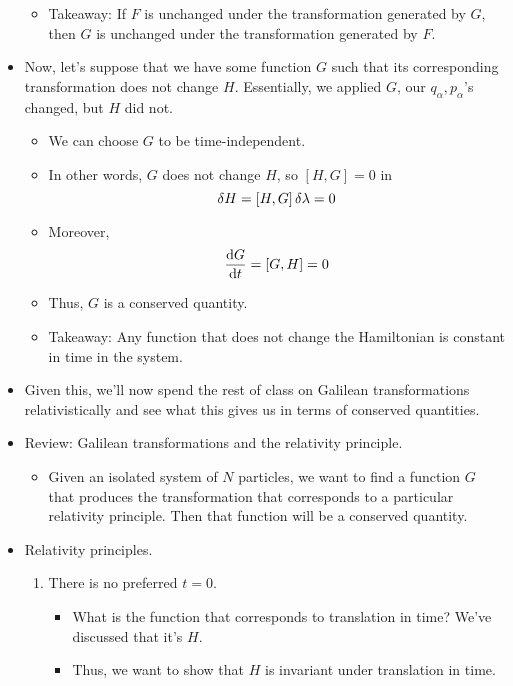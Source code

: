 \documentclass[../notes.tex]{subfiles}
\begin{document}
\begin{itemize}
\begin{itemize}
        \item Takeaway: If $F$ is unchanged under the transformation generated by $G$, then $G$ is unchanged under the transformation generated by $F$.
    \end{itemize}
    \item Now, let's suppose that we have some function $G$ such that its corresponding transformation does not change $H$. Essentially, we applied $G$, our $q_\alpha,p_\alpha$'s changed, but $H$ did not.
    \begin{itemize}
        \item We can choose $G$ to be time-independent.
        \item In other words, $G$ does not change $H$, so $[H,G]=0$ in
        \begin{equation*}
            \var{H} = [H,G]\var{\lambda} = 0
        \end{equation*}
        \item Moreover,
        \begin{equation*}
            \dv{G}{t} = [G,H] = 0
        \end{equation*}
        \item Thus, $G$ is a conserved quantity.
        \item Takeaway: Any function that does not change the Hamiltonian is constant in time in the system.
    \end{itemize}
    \item Given this, we'll now spend the rest of class on Galilean transformations relativistically and see what this gives us in terms of conserved quantities.
    \item Review: Galilean transformations and the relativity principle.
    \begin{itemize}
        \item Given an isolated system of $N$ particles, we want to find a function $G$ that produces the transformation that corresponds to a particular relativity principle. Then that function will be a conserved quantity.
    \end{itemize}
    \item Relativity principles.
    \begin{enumerate}
        \item There is no preferred $t=0$.
        \begin{itemize}
            \item What is the function that corresponds to translation in time? We've discussed that it's $H$.
            \item Thus, we want to show that $H$ is invariant under translation in time.

\end{itemize}
\end{enumerate}
\end{itemize}
\end{document}
